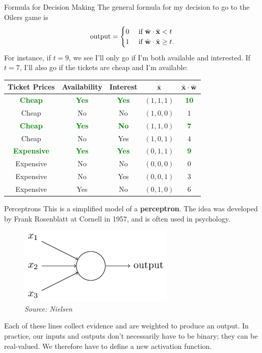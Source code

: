 \documentclass[xcolor=dvipsnames, fontsize=11pt, %
pagesize, %
parskip=half-, t]{beamer}
\begin{document}
\begin{frame}{Formula for Decision Making}
The general formula for my decision to go to the Oilers game is $$\text{output}=\begin{cases} 0 & \text{ if } \bar{\bold{w}}\cdot \bar{\bold{x}}<t \\ 
1 & \text{ if } \bar{\bold{w}}\cdot \bar{\bold{x}}\ge t. \end{cases}$$ \pause 
For instance, if $t=9$, we see I'll only go if I'm both available and interested. \pause If $t=7$, I'll also go if the tickets are cheap and I'm available:
\begin{table} 
\center 
\begin{tabular}{cccc|c}
Ticket Prices & Availability & Interest & $\bar{\bold{x}}$ & $\bar{\bold{x}}\cdot \bar{\bold{w}}$ \\ \hline 
\textbf{\textcolor{Green}{Cheap}} & \textbf{\textcolor{Green}{Yes}} & \textbf{\textcolor{Green}{Yes}} & $(1,1,1)$ & \textbf{\textcolor{Green}{10}} \\
Cheap & No & No & $(1,0,0)$ & $1$ \\
\textbf{\textcolor{Green}{Cheap }}& \textbf{\textcolor{Green}{Yes }}& \textbf{\textcolor{Green}{No}} & $(1,1,0)$ & \textbf{\textcolor{Green}{7}} \\
Cheap & No & Yes & $(1,0,1)$ & $4$   \\
\textbf{\textcolor{Green}{Expensive}} & \textbf{\textcolor{Green}{Yes}} & \textbf{\textcolor{Green}{Yes}} & $(0,1,1)$ & \textbf{\textcolor{Green}{9}} \\
Expensive & No & No & $(0,0,0)$  & $0$ \\
Expensive & No & Yes & $(0,0,1)$ & $3$\\
Expensive & Yes & No & $(0,1,0)$ & $6$
\end{tabular}
\end{table}
\end{frame}
\begin{frame}{Perceptrons}
This is a simplified model of a \textbf{perceptron}. The idea was developed by Frank Rosenblatt at Cornell in 1957, and is often used in psychology. \pause 

\begin{figure}
\center
\includegraphics[scale=0.66]{perc.png}
\caption{\textit{Source: Nielsen}}
\end{figure} \pause
\vspace{0.05\textheight} 
Each of these lines collect evidence and are weighted to produce an output. \pause In practice, our inputs and outputs don't necessarily have to be binary; they can be real-valued. We therefore have to define a new activation function.
\end{frame}
\end{document}
